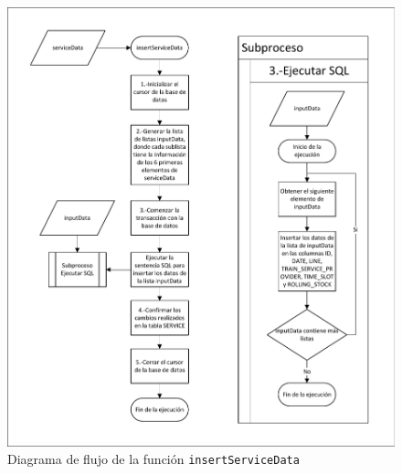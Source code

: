 \begin{figure}[H]
\centering
\includegraphics[width=.9\textwidth]{fig/Diagramas de flujo/insertServiceData.pdf}
\caption{Diagrama de flujo de la función \texttt{insertServiceData} }
\label{fig:diagramaFlujoInsertServiceData}
\end{figure}


